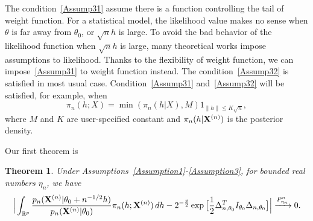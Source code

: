\documentclass[3p]{elsarticle}
\theoremstyle{plain}
\newtheorem{theorem}{\quad\quad Theorem}
\theoremstyle{definition}
\theoremstyle{remark}
\begin{document}
The condition~\ref{Assump31} assume there is a function controlling the tail of weight function. For a statistical model, the likelihood value makes no sense when $\theta$ is far away from $\theta_0$, or $\sqrt{n}h$ is large.
To avoid the bad behavior of the likelihood function when $\sqrt{n}h$ is large, many theoretical works impose assumptions to likelihood.
Thanks to the flexibility of weight function, we can impose~\ref{Assump31} to weight function instead.
The condition~\ref{Assump32} is satisfied in most usual case.
Condition~\ref{Assump31} and~\ref{Assump32} will be satisfied, for example, when 
\begin{equation}
    \pi_n(h;X)=\min(\pi_n(h|X),M) 1_{\|h\|\leq K\sqrt{n}},
\end{equation}
where $M$ and $K$ are user-specified constant and $\pi_n(h|\mathbf{X}^{(n)})$ is the posterior density.

Our first theorem is
\begin{theorem}\label{theoremMain}
    Under Assumptions~\ref{Assumption1}-\ref{Assumption3}, for bounded real numbers $\eta_n$, we have
    \begin{equation}
        \Big|\int_{\mathbb{R}^{p}}\frac{p_n(\mathbf{X}^{(n)}|\theta_0+n^{-1/2}h)}{p_n(\mathbf{X}^{(n)}|\theta_0)}\pi_n(h;\mathbf{X}^{(n)})\,dh-
        2^{-\frac{p}{2}}\exp\big[\frac{1}{2}\Delta_{n,\theta_0}^T I_{\theta_0}\Delta_{n,\theta_0}\big]
        \Big|\xrightarrow{P_{\eta_n}^n}0.
    \end{equation}
\end{theorem}
\end{document}
